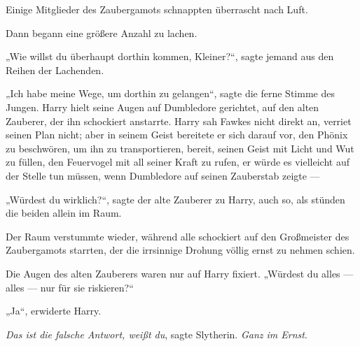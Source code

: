 Einige Mitglieder des Zaubergamots schnappten überrascht nach Luft.

Dann begann eine größere Anzahl zu lachen.

„Wie willst du überhaupt dorthin kommen, Kleiner?“, sagte jemand aus den Reihen der Lachenden.

„Ich habe meine Wege, um dorthin zu gelangen“, sagte die ferne Stimme des Jungen. Harry hielt seine Augen auf Dumbledore gerichtet, auf den alten Zauberer, der ihn schockiert anstarrte. Harry sah Fawkes nicht direkt an, verriet seinen Plan nicht; aber in seinem Geist bereitete er sich darauf vor, den Phönix zu beschwören, um ihn zu transportieren, bereit, seinen Geist mit Licht und Wut zu füllen, den Feuervogel mit all seiner Kraft zu rufen, er würde es vielleicht auf der Stelle tun müssen, wenn Dumbledore auf seinen Zauberstab zeigte —

„Würdest du wirklich?“, sagte der alte Zauberer zu Harry, auch so, als stünden die beiden allein im Raum.

Der Raum verstummte wieder, während alle schockiert auf den Großmeister des Zaubergamots starrten, der die irrsinnige Drohung völlig ernst zu nehmen schien.

Die Augen des alten Zauberers waren nur auf Harry fixiert.
„Würdest du alles — alles — nur für sie riskieren?“

„Ja“, erwiderte Harry.

\emph{Das ist die falsche Antwort, weißt du}, sagte Slytherin. \emph{Ganz im Ernst}.

